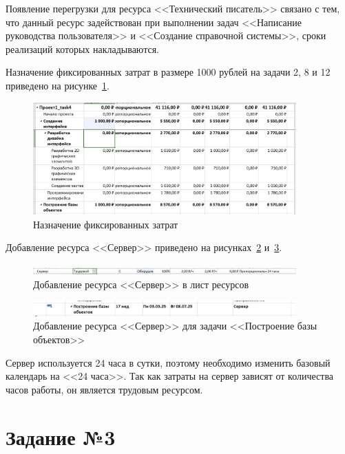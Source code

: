 Появление перегрузки для ресурса <<Технический писатель>> связано с тем, что данный ресурс задействован при выполнении задач <<Написание руководства пользователя>> и <<Создание справочной системы>>, сроки реализаций которых накладываются.

Назначение фиксированных затрат в размере 1000 рублей на задачи 2, 8 и 12 приведено на рисунке~\ref{fig:cost}.

\begin{figure}[H]
	\centering
	\includegraphics[width=0.9\textwidth]{img/task2/cost.jpg}
	\caption{Назначение фиксированных затрат}
	\label{fig:cost}
\end{figure}

Добавление ресурса <<Сервер>> приведено на рисунках~\ref{fig:server} и~\ref{fig:gant_server}.

\begin{figure}[H]
	\centering
	\includegraphics[width=0.9\textwidth]{img/task2/server.jpg}
	\caption{Добавление ресурса <<Сервер>> в лист ресурсов}
	\label{fig:server}
\end{figure}

\begin{figure}[H]
	\centering
	\includegraphics[width=0.9\textwidth]{img/task2/gant_server.jpg}
	\caption{Добавление ресурса <<Сервер>> для задачи <<Построение базы объектов>>}
	\label{fig:gant_server}
\end{figure}

Сервер используется 24 часа в сутки, поэтому необходимо изменить базовый календарь на <<24 часа>>.
Так как затраты на сервер зависят от количества часов работы, он является трудовым ресурсом.

\section{Задание №3}

